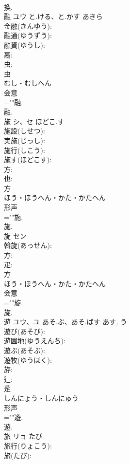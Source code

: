 \documentclass[8pt]{extreport}
\begin{document}
\begin{CJK}{UTF8}{min}
\\	換.
\\	融	ユウ	と.ける、と.かす	あきら	
\\	金融(きんゆう): 
\\	融通(ゆうずう): 
\\	融資(ゆうし): 
\\	鬲: 
\\	虫: 
\\	虫	
\\	むし・むしへん	
\\	会意 
\\	=""融.
\\	融.
\\	施	シ、セ	ほどこ.す		
\\	施設(しせつ): 
\\	実施(じっし): 
\\	施行(しこう): 
\\	施す(ほどこす): 
\\	方: 
\\	也: 
\\	方	
\\	ほう・ほうへん・かた・かたへん	
\\	形声 
\\	=""施.
\\	施.
\\	旋	セン			
\\	斡旋(あっせん): 
\\	方: 
\\	疋: 
\\	方	
\\	ほう・ほうへん・かた・かたへん	
\\	会意 
\\	=""旋.
\\	旋.
\\	遊	ユウ、ユ	あそ.ぶ、あそ.ばす	あす, う	
\\	遊び(あそび): 
\\	遊園地(ゆうえんち): 
\\	遊ぶ(あそぶ): 
\\	遊牧(ゆうぼく): 
\\	斿: 
\\	辶: 
\\	辵	
\\	しんにょう・しんにゅう	
\\	形声 
\\	=""遊.
\\	遊.
\\	旅	リョ	たび		
\\	旅行(りょこう): 
\\	旅(たび): 

\end{CJK}
\end{document}
